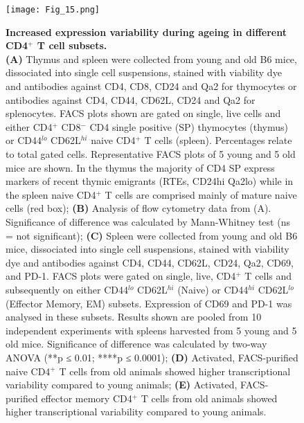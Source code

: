 \begin{figure}[!ht]
\centering
\texttt{[image: Fig\_15.png]}
\caption[Increased expression variability during ageing in different CD4$^+$ T cell subsets]{\textbf{Increased expression variability during ageing in different CD4$^+$ T cell subsets.} \\
\textbf{(A)} Thymus and spleen were collected from young and old B6 mice, dissociated into single cell suspensions, stained with viability dye and antibodies against CD4, CD8, CD24 and Qa2 for thymocytes or antibodies against CD4, CD44, CD62L, CD24 and Qa2 for splenocytes. FACS plots shown are gated on single, live cells and either CD4$^+$ CD8$^-$ CD4 single positive (SP) thymocytes (thymus) or CD44$^{lo}$ CD62L$^{hi}$ naive CD4$^+$ T cells (spleen). Percentages relate to total gated cells. Representative FACS plots of 5 young and 5 old mice are shown. In the thymus the majority of CD4 SP express markers of recent thymic emigrants (RTEs, CD24hi Qa2lo) while in the spleen naive CD4$^+$ T cells are comprised mainly of mature naive cells (red box); \textbf{(B)} Analysis of flow cytometry data from (A). Significance of difference was calculated by Mann-Whitney test (ns = not significant); \textbf{(C)} Spleen were collected from young and old B6 mice, dissociated into single cell suspensions, stained with viability dye and antibodies against CD4, CD44, CD62L, CD24, Qa2, CD69, and PD-1. FACS plots were gated on single, live, CD4$^+$ T cells and subsequently on either CD44$^{lo}$ CD62L$^{hi}$ (Naive) or CD44$^{hi}$ CD62L$^{lo}$ (Effector Memory, EM) subsets. Expression of CD69 and PD-1 was analysed in these subsets. Results shown are pooled from 10 independent experiments with spleens harvested from 5 young and 5 old mice. Significance of difference was calculated by two-way ANOVA (**p ≤ 0.01; ****p ≤ 0.0001); \textbf{(D)} Activated, FACS-purified naive CD4$^+$ T cells from old animals showed higher transcriptional variability compared to young animals; \textbf{(E)} Activated, FACS-purified effector memory CD4$^+$ T cells from old animals showed higher transcriptional variability compared to young animals.
}
\label{fig1:EM_Naive_CD4}
\end{figure}


